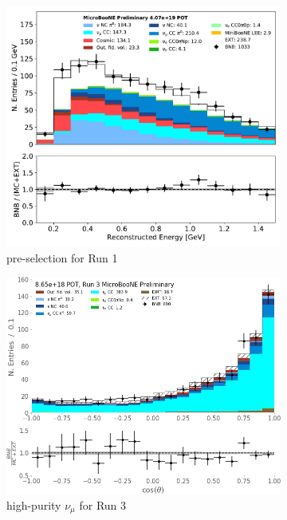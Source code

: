 \begin{figure}[ht] 
\begin{center}
    \begin{subfigure}[b]{0.4\textwidth}
    \centering
    \includegraphics[width=1.00\textwidth]{1eNp/reco_e_01162020_RUN1.pdf}
    \caption{\label{fig:datamccomparisons:nuepresel} \npsel pre-selection for Run  1}
    \end{subfigure}
    \begin{subfigure}[b]{0.44\textwidth}
    \centering
    \includegraphics[width=1.00\textwidth]{NuMuCCsel/Images/Ryan/Run3_costheta_withCRT.jpg}
    \caption{\label{fig:datamccomparisons:numu} high-purity $\nu_{\mu}$ for Run 3}
    \end{subfigure}
\caption{\label{fig:datamccomparisons} }
\end{center}
\end{figure}

